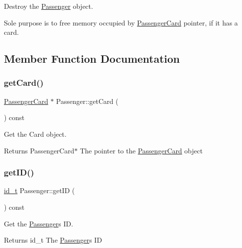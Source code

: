 Destroy the \mbox{\hyperlink{classPassenger}{Passenger}} object. 

Sole purpose is to free memory occupied by \mbox{\hyperlink{classPassengerCard}{Passenger\+Card}} pointer, if it has a card. 

\subsection{Member Function Documentation}
\mbox{\label{classPassenger_ae8d5310db80438702dec5f4d649289f1}} 
\subsubsection{\texorpdfstring{get\+Card()}{getCard()}}
{\footnotesize\ttfamily \mbox{\hyperlink{classPassengerCard}{Passenger\+Card}} $\ast$ Passenger\+::get\+Card (\begin{DoxyParamCaption}{ }\end{DoxyParamCaption}) const}



Get the Card object. 

\begin{DoxyReturn}{Returns}
Passenger\+Card$\ast$ The pointer to the \mbox{\hyperlink{classPassengerCard}{Passenger\+Card}} object 
\end{DoxyReturn}
\mbox{\label{classPassenger_ae6fcc19037be144f654c623c5b78ae24}} 
\subsubsection{\texorpdfstring{get\+I\+D()}{getID()}}
{\footnotesize\ttfamily \mbox{\hyperlink{project__utils_8h_a8f3a969054ad2200720b96e7e23dd4e1}{id\+\_\+t}} Passenger\+::get\+ID (\begin{DoxyParamCaption}{ }\end{DoxyParamCaption}) const}



Get the \mbox{\hyperlink{classPassenger}{Passenger}}\textquotesingle{}s ID. 

\begin{DoxyReturn}{Returns}
id\+\_\+t The \mbox{\hyperlink{classPassenger}{Passenger}}\textquotesingle{}s ID 
\end{DoxyReturn}
\mbox{\label{classPassenger_a4d8911ca0e8fe1d9226594674bd04af4}} 
